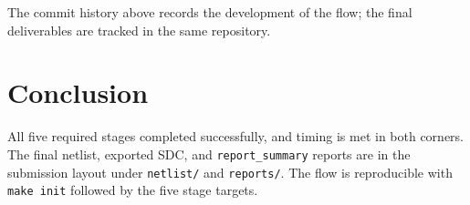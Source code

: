 \documentclass[11pt]{article}
\begin{document}
The commit history above records the development of the flow; the final
deliverables are tracked in the same repository.

\section{Conclusion}

All five required stages completed successfully, and timing is met in both
corners. The final netlist, exported SDC, and \texttt{report\_summary} reports
are in the submission layout under \texttt{netlist/} and \texttt{reports/}. The
flow is reproducible with \texttt{make init} followed by the five stage targets.
\end{document}
